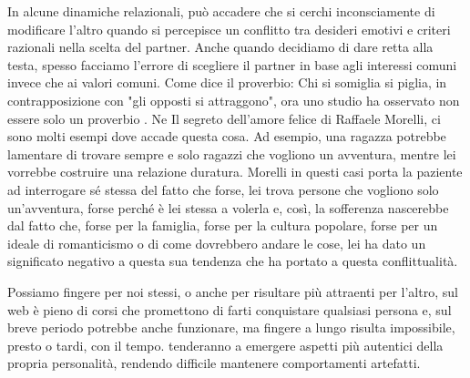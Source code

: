 \documentclass[12pt]{book} %
\begin{document}
In alcune dinamiche relazionali, può accadere che si cerchi inconsciamente di modificare l'altro quando si percepisce un conflitto tra desideri emotivi e criteri razionali nella scelta del partner. Anche quando decidiamo di dare retta alla testa, spesso facciamo
l'errore di scegliere il partner in base agli interessi comuni invece che ai valori comuni. 
Come dice il proverbio: Chi si somiglia si piglia, in contrapposizione con "gli opposti si attraggono", ora uno studio ha osservato non essere solo un proverbio . 
Ne Il segreto dell'amore felice di Raffaele Morelli, ci sono molti esempi dove
accade questa cosa. Ad esempio, una ragazza potrebbe lamentare di trovare sempre e solo ragazzi che vogliono un
avventura, mentre lei vorrebbe costruire una relazione duratura. Morelli in questi casi porta la paziente ad
interrogare sé stessa del fatto che forse, lei trova persone che vogliono solo un'avventura, forse perché è lei stessa a
volerla e, così, la sofferenza nascerebbe dal fatto che, forse per la famiglia, forse per la cultura
popolare, forse per un ideale di romanticismo o di come dovrebbero andare le cose, lei ha dato un significato negativo a questa sua tendenza che ha portato a questa conflittualità.

Possiamo fingere per noi stessi, o anche per risultare più attraenti per l'altro, sul web è pieno
di corsi che promettono di farti conquistare qualsiasi persona e, sul breve periodo potrebbe anche funzionare, ma
fingere a lungo risulta impossibile, presto o tardi, con il tempo. tenderanno a emergere aspetti più autentici della propria personalità, rendendo difficile mantenere comportamenti artefatti.
\end{document}
